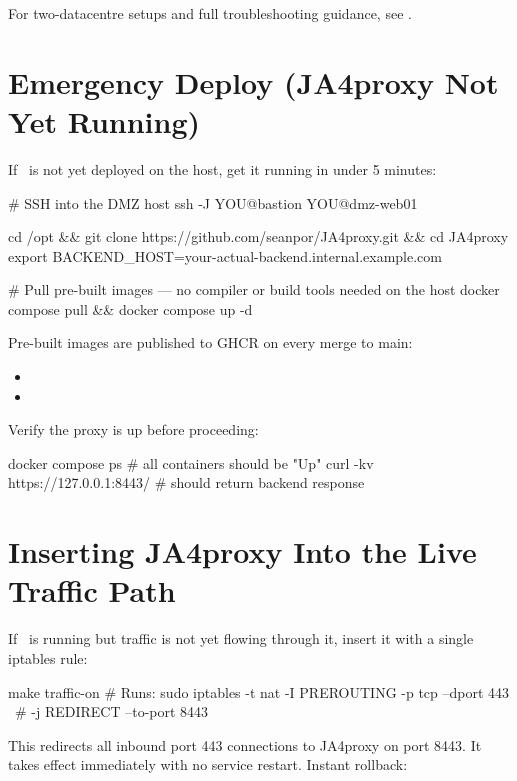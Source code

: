 For two-datacentre setups and full troubleshooting guidance, see
.

\section{Emergency Deploy (JA4proxy Not Yet Running)}

If \ja\ is not yet deployed on the host, get it running in under 5 minutes:

\begin{bashcode}
# SSH into the DMZ host
ssh -J YOU@bastion YOU@dmz-web01

cd /opt && git clone https://github.com/seanpor/JA4proxy.git && cd JA4proxy
export BACKEND_HOST=your-actual-backend.internal.example.com

# Pull pre-built images — no compiler or build tools needed on the host
docker compose pull && docker compose up -d
\end{bashcode}

Pre-built images are published to GHCR on every merge to main:
\begin{itemize}
  \item {}
  \item {}
\end{itemize}

Verify the proxy is up before proceeding:
\begin{bashcode}
docker compose ps          # all containers should be "Up"
curl -kv https://127.0.0.1:8443/   # should return backend response
\end{bashcode}

\section{Inserting JA4proxy Into the Live Traffic Path}

If \ja\ is running but traffic is not yet flowing through it, insert it with a
single iptables rule:

\begin{bashcode}
make traffic-on
# Runs: sudo iptables -t nat -I PREROUTING -p tcp --dport 443 \
#         -j REDIRECT --to-port 8443
\end{bashcode}

This redirects all inbound port 443 connections to JA4proxy on port 8443.
It takes effect immediately with no service restart. Instant rollback:

